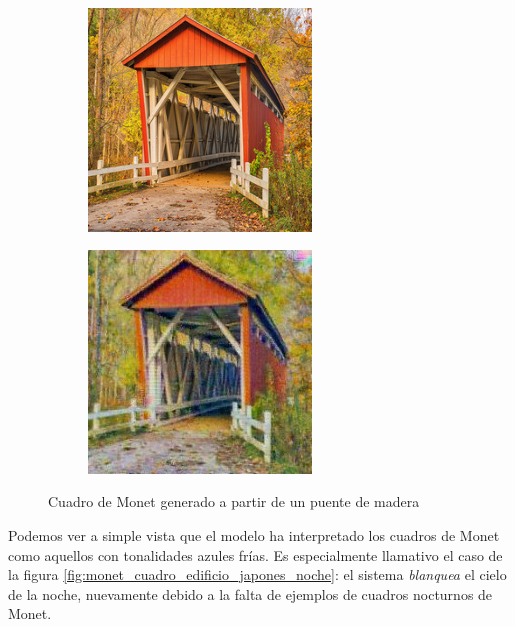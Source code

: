 \documentclass[[../main.tex]{subfiles}
\begin{document}
        \begin{figure}[!htb]
            \begin{subfigure}[b]{0.49\textwidth}
            \includegraphics[width=0.65\textwidth]{imagenes/imagen2cuadro/dataset/monet/2014-10-24 04_26_01.jpg}
            \end{subfigure}
        \hfill
            \begin{subfigure}[b]{0.49\textwidth}
            \includegraphics[width=0.65\textwidth]{imagenes/imagen2cuadro/dataset/monet/2014-10-24 04_26_01_2.jpg}
            \end{subfigure}
        \caption{Cuadro de Monet generado a partir de un puente de madera}
        \label{fig:monet_cuadro_puente_madera}
        \end{figure}
        
        Podemos ver a simple vista que el modelo ha interpretado los cuadros de Monet como aquellos con tonalidades azules frías. Es especialmente llamativo el caso de la figura \ref{fig:monet_cuadro_edificio_japones_noche}: el sistema \textit{blanquea} el cielo de la noche, nuevamente debido a la falta de ejemplos de cuadros nocturnos de Monet.
        
\end{document}
